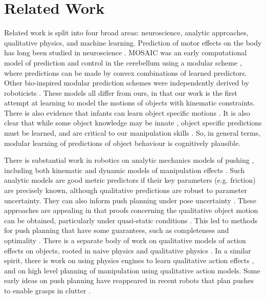 \section{Related Work}\label{sec:Background}

Related work is split into four broad areas: neuroscience, analytic approaches, qualitative physics, and machine learning. Prediction of motor effects on the body has long been studied in neuroscience \citep{Miall1996,flanagan03}.  MOSAIC was an early computational model of prediction and control in the cerebellum using a modular scheme \citep{Haruno_MOSAIC_2008}, where predictions can be made by convex combinations of learned predictors. Other bio-inspired modular prediction schemes were independently derived by roboticists \citep{demiris2006hierarchical}. These models all differ from ours, in that our work is the first attempt at learning to model the motions of objects with kinematic constraints. There is also evidence that infants can learn object specific motions \citep{Bahrick1995}. It is also clear that while some object knowledge may be innate \citep{spelke1994early}, object specific predictions must be learned, and are critical to our manipulation skills \citep{flanagan06}. So, in general terms, modular learning of predictions of object behaviour is cognitively plausible.

There is substantial work in robotics on analytic mechanics models of pushing \citep{mason_manipulator_1982,lynch_mechanics_1992,peshkin_motion_1988,cappelleri_designing_2006}, including both kinematic and dynamic models of manipulation effects \citep{mason_mechanics_2001}. Such analytic models are good metric predictors if their key parameters (e.g. friction) are precisely known, although qualitative predictions are robust to parameter uncertainty. They can also inform push planning under pose uncertainty \citep{brost1985planning}. These approaches are appealing in that proofs concerning the qualitative object motion can be obtained, particularly under quasi-static conditions \citep{mason1985robot,peshkin_motion_1988}. This led to methods for push planning that have some guarantees, such as completeness and optimality \citep{lynchmason96}. There is a separate body of work on qualitative models of action effects on objects, rooted in naive physics \citep{hayes1995second} and qualitative physics \citep{kuipers1986qualitative}. In a similar spirit, there is work on using physics engines to learn qualitative action effects \citep{Mugan-tamd-12}, and on high level planning of manipulation \citep{stillman08ijrr,roy2004mental} using qualitative action models. Some early ideas on push planning have reappeared in recent robots that plan pushes to enable grasps in clutter \citep{Dogar_2010}.


